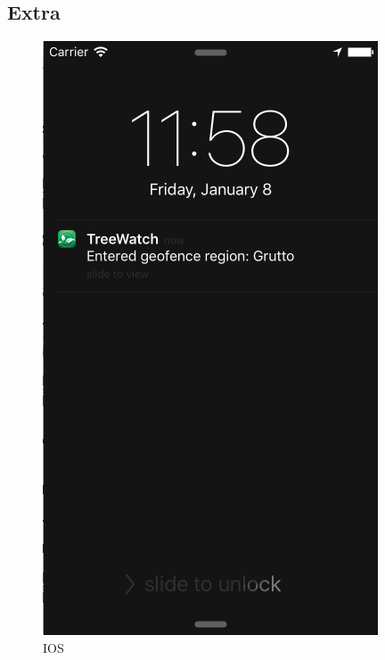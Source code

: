\documentclass[12pt]{article}
\begin{document}
\subsection{Extra}
\begin{figure}[ht]
	\centering
	\includegraphics[width=\linewidth, height=0.4\textheight, keepaspectratio=true, frame]{screenshots/GeofenceIos.png}
	\caption{IOS}
	\endminipage\hfill
	\centering

\end{figure}
\end{document}

